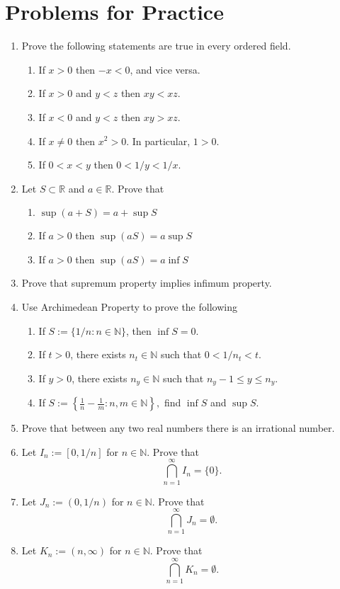 \documentclass[12pt]{article}
\begin{document}
\newpage

\section{Problems for Practice}

\begin{enumerate}

    \item Prove the following statements are true in every ordered field.

    \begin{enumerate}
        \item If $x > 0$ then $-x < 0$, and vice versa.
        \item If $x > 0$ and $y < z$ then $xy < xz$.
        \item If $x < 0$ and $y < z$ then $xy > xz$.
        \item If $x \neq 0$ then $x^2 > 0$. In particular, $1 > 0$.
        \item If $0 < x < y$ then $0 < 1/y < 1/x$.
    \end{enumerate}

    \item Let $S\subset\mathbb{R}$ and $a\in\mathbb{R}$. Prove that
    \begin{enumerate}
        \item $\sup (a+S)=a+\sup S$
        \item If $a>0$ then $\sup (aS)=a\sup S$
        \item If $a>0$ then $\sup (aS)=a\inf S$
    \end{enumerate}
    \item Prove that supremum property implies infimum property.
    \item Use Archimedean Property to prove the following
    \begin{enumerate}
        \item If $S := \{1/n : n \in \mathbb{N}\}$, then $\inf S = 0$.
        \item If $t > 0$, there exists $n_t \in \mathbb{N}$ such that $0 < 1/n_t < t$.
        \item If $y > 0$, there exists $n_y \in \mathbb{N}$ such that $n_y - 1 \leq y \leq n_y$.
        \item If \( S := \left\{ \frac{1}{n} - \frac{1}{m} : n, m \in \mathbb{N} \right\}, \) find \( \inf S \) and \( \sup S \).
    \end{enumerate}
    \item Prove that between any two real numbers there is an irrational number.
    \item Let \( I_n := [0, 1/n] \) for \( n \in \mathbb{N} \). Prove that
    \[
    \bigcap_{n=1}^{\infty} I_n = \{0\}.
    \]

    \item Let \( J_n := (0, 1/n) \) for \( n \in \mathbb{N} \). Prove that
    \[
    \bigcap_{n=1}^{\infty} J_n = \emptyset.
    \]

    \item Let \( K_n := (n, \infty) \) for \( n \in \mathbb{N} \). Prove that
    \[
    \bigcap_{n=1}^{\infty} K_n = \emptyset.
    \]

\end{enumerate}
\end{document}
